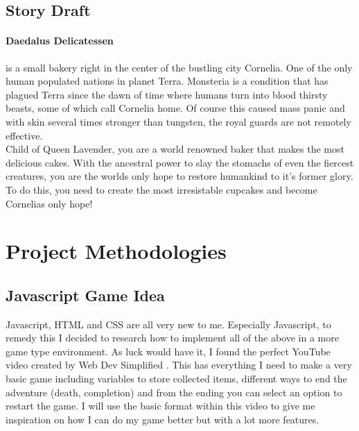 \documentclass[10pt, a4paper]{article}
\begin{document}
	\subsection{Story Draft}
	\paragraph{Daedalus Delicatessen} is a small bakery right in the center of the bustling city Cornelia. One of the only
	human populated nations in planet Terra. Monsteria is a condition that has plagued Terra since the dawn of time where
	humans turn into blood thirsty beasts, some of which call Cornelia home. Of course this caused mass panic and with skin
	several times stronger than tungsten, the royal guards are not remotely effective. \\ 
	\hspace{5mm} Child of Queen Lavender, you are a world renowned baker that makes the most delicious cakes. With the
	ancestral power to slay the stomachs of even the fiercest creatures, you are the worlds only hope to restore humankind
	to it's former glory. To do this, you need to create the most irresistable cupcakes and become Cornelias only hope!
	
	\section{Project Methodologies}
	\subsection{Javascript Game Idea}
	Javascript, HTML and CSS are all very new to me. Especially Javascript, to remedy this I decided to research how to implement all of the above in a more game type environment. As	luck would have it, I found the perfect YouTube video created by Web Dev Simplified	\cite{JavascriptGame}. This has everything I need to make a very basic game including	variables to store collected items, different ways to end the adventure (death, completion) and from the ending you can select an option to restart the game. I will use the basic format within this video to give me inspiration on how I can do my game better but with a lot more features.
	
\end{document}
